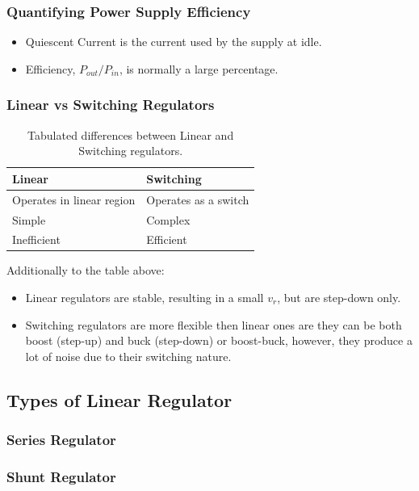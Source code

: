 \subsubsection{Quantifying Power Supply Efficiency}

\begin{itemize}
	\item Quiescent Current is the current used by the supply at idle.
	\item Efficiency, $P_{out} / P_{in}$, is normally a large percentage.
\end{itemize}

\subsubsection{Linear vs Switching Regulators}

\begin{table}[H]
	\centering
	\caption{Tabulated differences between Linear and Switching regulators.}
    \begin{tabular}{ll}
    Linear & Switching \\
    \hline
    Operates in linear region & Operates as a switch \\
    Simple & Complex \\
    Inefficient & Efficient
    \end{tabular}
\end{table}

Additionally to the table above:

\begin{itemize}
	\item Linear regulators are stable, resulting in a small $v_r$, but are step-down only.
	\item Switching regulators are more flexible then linear ones are they can be both boost (step-up) and buck (step-down) or boost-buck, however, they produce a lot of noise due to their switching nature.
\end{itemize}

\subsection{Types of Linear Regulator}

\subsubsection{Series Regulator}

\subsubsection{Shunt Regulator}


